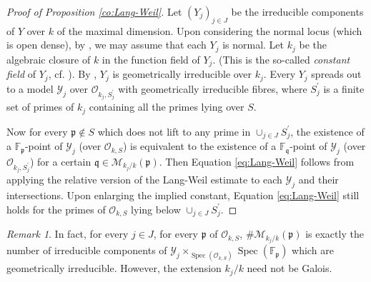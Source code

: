 \documentclass[11pt,letterpaper]{amsart}
\newcommand{\BF}{{\mathbb {F}}}
\newcommand{\CM}{{\mathcal {M}}}
\newcommand{\CO}{{\mathcal {O}}}
\newcommand{\CY}{{\mathcal {Y}}}
\theoremstyle{plain}
\numberwithin{equation}{section}
\theoremstyle{definition}
\theoremstyle{remark}
\newtheorem{remark}[theorem]{Remark}
\begin{document}
\begin{proof}[Proof of Proposition \ref{co:Lang-Weil}]
	Let $(Y_j)_{j\in J}$ be the irreducible components of $Y$ over $k$ of the maximal dimension. Upon considering the normal locus (which is open dense), by \cite[Theorem~7.7.1 (i)]{Poonen}, we may assume that each $Y_j$ is normal. Let $k_j$ be the algebraic closure of $k$ in the function field of $Y_j$. (This is the so-called \emph{constant field} of $Y_j$, cf. \cite[\S2.2.4]{Poonen}). By \cite[Propositions~2.2.19, 2.2.22]{Poonen}, $Y_j$ is geometrically irreducible over $k_j$.
	Every $Y_j$ spreads out to a model $\CY_j$ over $\CO_{k_j,S_j^\prime}$ with geometrically irreducible fibres, where $S_j^\prime$ is a finite set of primes of $k_j$ containing all the primes lying over $S$.
	
	Now for every $\mathfrak{p}\notin S$ which does not lift to any prime in $\cup_{j\in J}S_j^\prime$, the existence of a $\BF_{\mathfrak{p}}$-point of $\CY_j$ (over $\CO_{k,S}$) is equivalent to the existence of a $\BF_{\mathfrak{q}}$-point of $\CY_j$ (over $\CO_{k_j,S_j^\prime}$) for a certain $\mathfrak{q}\in\CM_{k_j/k}(\mathfrak{p})$. Then Equation \eqref{eq:Lang-Weil} follows from applying the relative version of the Lang-Weil estimate \cite[Theorem~7.7.1 (iii)]{Poonen} to each $\CY_j$ and their intersections. Upon enlarging the implied constant, Equation \eqref{eq:Lang-Weil} still holds for the primes of $\CO_{k,S}$ lying below $\cup_{j\in J}S_j^\prime$.
\end{proof}
\begin{remark}
	In fact, for every $j\in J$, for every $\mathfrak{p}$ of $\CO_{k,S}$, $\#\CM_{k_j/k}(\mathfrak{p})$ is exactly the number of irreducible components of $\CY_j \times_{\operatorname{Spec}(\CO_{k,S})} \operatorname{Spec}(\BF_{\mathfrak{p}})$ which are geometrically irreducible. However, the extension $k_j/k$ need not be Galois. \end{remark}
\end{document}
